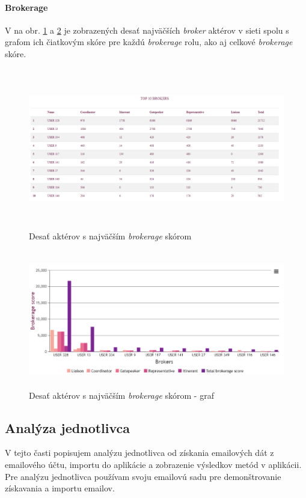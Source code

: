 \documentclass[slovak,master,public,dept460,male,cpdeclaration,oneside]{diploma}
\begin{document}
\paragraph{Brokerage}
\hfill \break
V na obr. \ref{team_brokerage_tab} a \ref{team_brokerage_graph} je zobrazených desať najväčších \textit{broker} aktérov v sieti spolu s grafom ich čiatkovým skóre pre každú \textit{brokerage} rolu, ako aj celkové \textit{brokerage} skóre.


\begin{figure}[H]
\centering
\includegraphics[width=16cm, height=7cm]{figures/team_brokerage_tab}
\caption{Desať aktérov s najväčším \textit{brokerage} skórom}
\label{team_brokerage_tab}
\end{figure}


\begin{figure}[H]
\centering
\includegraphics[width=15cm, height=6cm]{figures/team_brokerage_graph}
\caption{Desať aktérov s najväčším \textit{brokerage} skórom - graf}
\label{team_brokerage_graph}
\end{figure}

\subsection{Analýza jednotlivca}
V tejto časti popisujem analýzu jednotlivca od získania emailových dát z emailového účtu, importu do aplikácie a zobrazenie výsledkov metód v aplikácii. Pre analýzu jednotlivca používam svoju emailovú sadu pre demonštrovanie získavania a importu emailov.
\end{document}
